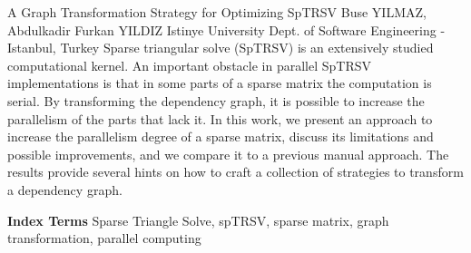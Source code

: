 
    \begin{abstract_online}{A Graph Transformation Strategy for Optimizing SpTRSV}{%
        Buse YILMAZ, Abdulkadir Furkan YILDIZ}{%
        }{%
        Istinye University Dept. of Software Engineering - Istanbul, Turkey}
    Sparse triangular solve (SpTRSV) is an extensively studied computational kernel. An important obstacle in parallel SpTRSV implementations is that in some parts of a sparse matrix the computation is serial. By transforming the dependency graph, it is possible to increase the parallelism of the parts that lack it. In this work, we present an approach to increase the parallelism degree of a sparse matrix, discuss its limitations and possible improvements, and we compare it to a previous manual approach. The results provide several hints on how to craft a collection of strategies to transform a dependency graph. 
    
            \textbf{Index Terms} \newline{}Sparse Triangle Solve, spTRSV, sparse matrix, graph transformation, parallel computing
    \end{abstract_online}
    